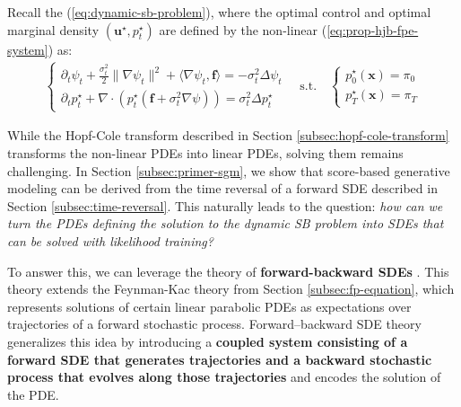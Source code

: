 \documentclass{article}
\newcommand{\boldtext}[1]{\textbf{\textcolor{MyGreen}{#1}}}
\begin{document}
Recall the (\ref{eq:dynamic-sb-problem}), where the optimal control and optimal marginal density $(\boldsymbol{u}^\star, p_t^\star)$ are defined by the non-linear (\ref{eq:prop-hjb-fpe-system}) as: 
\begin{align}
    \begin{cases}
        \partial_t\psi_t+\frac{\sigma_t^2}{2}\|\nabla\psi_t\|^2 +\langle\nabla \psi_t, \boldsymbol{f}\rangle=-\sigma_t^2\Delta \psi_t\\
        \partial_t p^\star_t+\nabla\cdot (p^\star_t(\boldsymbol{f}+\sigma_t^2\nabla \psi))=\sigma_t^2\Delta p^\star_t
    \end{cases}\quad \text{s.t.}\quad \begin{cases}
        p^\star_0(\boldsymbol{x})=\pi_0\\
        p^\star_T(\boldsymbol{x})=\pi_T
    \end{cases}
\end{align}

While the Hopf-Cole transform described in Section \ref{subsec:hopf-cole-transform} transforms the non-linear PDEs into linear PDEs, solving them remains challenging. In Section \ref{subsec:primer-sgm}, we show that score-based generative modeling can be derived from the time reversal of a forward SDE described in Section \ref{subsec:time-reversal}. This naturally leads to the question: \textit{how can we turn the PDEs defining the solution to the dynamic SB problem into SDEs that can be solved with likelihood training?}

To answer this, we can leverage the theory of \boldtext{forward-backward SDEs} \citep{exarchos2018stochastic}. This theory extends the Feynman-Kac theory from Section \ref{subsec:fp-equation}, which represents solutions of certain linear parabolic PDEs as expectations over trajectories of a forward stochastic process. Forward–backward SDE theory generalizes this idea by introducing a \textbf{coupled system consisting of a forward SDE that generates trajectories and a backward stochastic process that evolves along those trajectories} and encodes the solution of the PDE.
\end{document}
